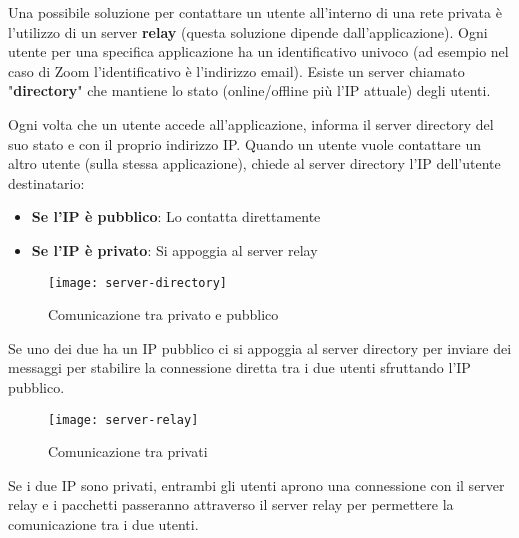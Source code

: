 \documentclass[a4paper]{article}
\begin{document}
\noindent
Una possibile soluzione per contattare un utente all'interno di una rete privata è
l'utilizzo di un server \textbf{relay} (questa soluzione dipende dall'applicazione).
Ogni utente per una specifica applicazione ha un identificativo univoco (ad esempio
nel caso di Zoom l'identificativo è l'indirizzo email). Esiste un server chiamato
"\textbf{directory}" che mantiene lo stato (online/offline più l'IP attuale) degli utenti.

\noindent
Ogni volta che un utente accede all'applicazione, informa il server directory del suo
stato e con il proprio indirizzo IP. Quando un utente vuole contattare un altro utente
(sulla stessa applicazione), chiede al server directory l'IP dell'utente destinatario:
\begin{itemize}
  \item \textbf{Se l'IP è pubblico}: Lo contatta direttamente
  \item \textbf{Se l'IP è privato}: Si appoggia al server relay
\end{itemize}
\begin{figure}[H]
  \centering
  \texttt{[image: server-directory]}
  \caption{Comunicazione tra privato e pubblico}
\end{figure}
\noindent
Se uno dei due ha un IP pubblico ci si appoggia al server directory per inviare dei
messaggi per stabilire la connessione diretta tra i due utenti sfruttando l'IP pubblico.

\begin{figure}[H]
  \centering
  \texttt{[image: server-relay]}
  \caption{Comunicazione tra privati}
\end{figure}
\noindent
Se i due IP sono privati, entrambi gli utenti aprono una connessione con il server relay
e i pacchetti passeranno attraverso il server relay per permettere la comunicazione tra
i due utenti.
\end{document}
